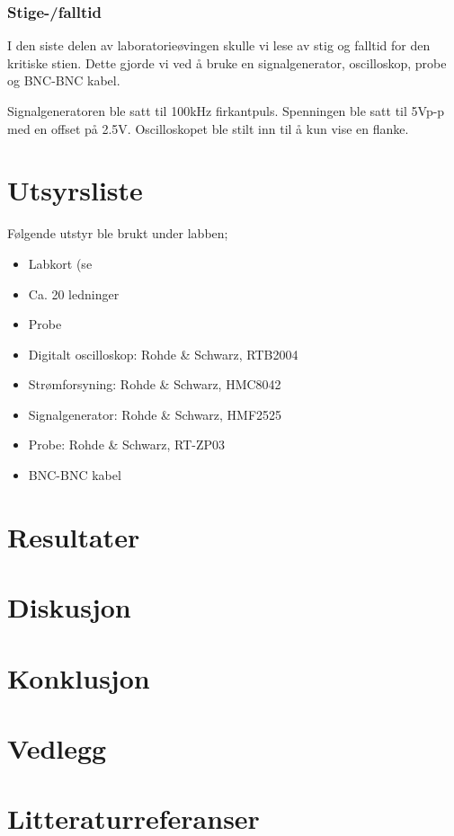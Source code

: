 \documentclass{article}
\begin{document}
\subsubsection{Stige-/falltid}
I den siste delen av laboratorieøvingen skulle vi lese av stig og falltid for den kritiske stien. Dette gjorde vi ved å bruke en signalgenerator, oscilloskop, probe og BNC-BNC kabel. 

Signalgeneratoren ble satt til 100kHz firkantpuls. Spenningen ble satt til 5Vp-p med en offset på 2.5V.  Oscilloskopet ble stilt inn til å kun vise en flanke. 






\section{Utsyrsliste}
Følgende utstyr ble brukt under labben;
\begin{itemize}
	\item Labkort (se %
	\item Ca. 20 ledninger
	\item Probe
	\item Digitalt oscilloskop: Rohde \& Schwarz, RTB2004
	\item Strømforsyning: Rohde \& Schwarz, HMC8042
	\item Signalgenerator: Rohde \& Schwarz, HMF2525
	\item Probe: Rohde \& Schwarz, RT-ZP03
	\item BNC-BNC kabel
\end{itemize}

\section{Resultater}


\section{Diskusjon}

\section{Konklusjon}

\section{Vedlegg}

\section{Litteraturreferanser}
\end{document}
